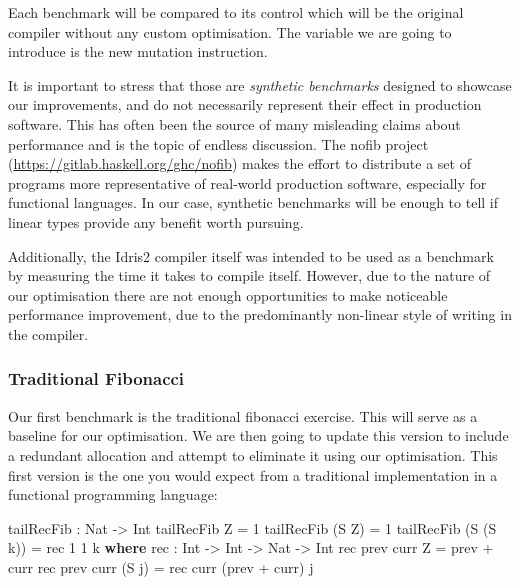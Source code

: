 \documentclass[
]{article}
\newenvironment{Shaded}{}{}
\newcommand{\DataTypeTok}[1]{\textcolor[rgb]{0.56,0.13,0.00}{#1}}
\newcommand{\DecValTok}[1]{\textcolor[rgb]{0.25,0.63,0.44}{#1}}
\newcommand{\KeywordTok}[1]{\textcolor[rgb]{0.00,0.44,0.13}{\textbf{#1}}}
\newcommand{\NormalTok}[1]{#1}
\newcommand{\OperatorTok}[1]{\textcolor[rgb]{0.40,0.40,0.40}{#1}}
\newcommand{\OtherTok}[1]{\textcolor[rgb]{0.00,0.44,0.13}{#1}}
\begin{document}
Each benchmark will be compared to its control which will be the
original compiler without any custom optimisation. The variable we are
going to introduce is the new mutation instruction.

It is important to stress that those are \emph{synthetic benchmarks}
designed to showcase our improvements, and do not necessarily represent
their effect in production software. This has often been the source of
many misleading claims about performance and is the topic of endless
discussion. The nofib\cite{nofib} project
(\url{https://gitlab.haskell.org/ghc/nofib}) makes the effort to
distribute a set of programs more representative of real-world
production software, especially for functional languages. In our case,
synthetic benchmarks will be enough to tell if linear types provide any
benefit worth pursuing.

Additionally, the Idris2 compiler itself was intended to be used as a
benchmark by measuring the time it takes to compile itself. However, due
to the nature of our optimisation there are not enough opportunities to
make noticeable performance improvement, due to the predominantly
non-linear style of writing in the compiler.

\hypertarget{traditional-fibonacci}{%
\subsubsection{Traditional Fibonacci}\label{traditional-fibonacci}}

Our first benchmark is the traditional fibonacci exercise. This will
serve as a baseline for our optimisation. We are then going to update
this version to include a redundant allocation and attempt to eliminate
it using our optimisation. This first version is the one you would
expect from a traditional implementation in a functional programming
language:

\begin{Shaded}
\begin{Highlighting}[]
\NormalTok{tailRecFib }\OperatorTok{:} \DataTypeTok{Nat} \OtherTok{{-}\textgreater{}} \DataTypeTok{Int}
\NormalTok{tailRecFib }\DataTypeTok{Z} \OtherTok{=} \DecValTok{1}
\NormalTok{tailRecFib (}\DataTypeTok{S} \DataTypeTok{Z}\NormalTok{) }\OtherTok{=} \DecValTok{1}
\NormalTok{tailRecFib (}\DataTypeTok{S}\NormalTok{ (}\DataTypeTok{S}\NormalTok{ k)) }\OtherTok{=}\NormalTok{ rec }\DecValTok{1} \DecValTok{1}\NormalTok{ k}
  \KeywordTok{where}
\NormalTok{    rec }\OperatorTok{:} \DataTypeTok{Int} \OtherTok{{-}\textgreater{}} \DataTypeTok{Int} \OtherTok{{-}\textgreater{}} \DataTypeTok{Nat} \OtherTok{{-}\textgreater{}} \DataTypeTok{Int}
\NormalTok{    rec prev curr }\DataTypeTok{Z} \OtherTok{=}\NormalTok{ prev }\OperatorTok{+}\NormalTok{ curr}
\NormalTok{    rec prev curr (}\DataTypeTok{S}\NormalTok{ j) }\OtherTok{=}\NormalTok{ rec curr (prev }\OperatorTok{+}\NormalTok{ curr) j}
\end{Highlighting}
\end{Shaded}
\end{document}
